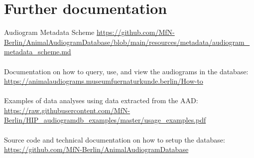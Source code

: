 \documentclass{article}
\begin{document}
\section{Further documentation}
Audiogram Metadata Scheme
\url{https://github.com/MfN-Berlin/AnimalAudiogramDatabase/blob/main/resources/metadata/audiogram_metadata_scheme.md}
\\\\
Documentation on how to query, use, and view the audiograms in the database:
\url{https://animalaudiograms.museumfuernaturkunde.berlin/How-to}
\\\\
Examples of data analyses using data extracted from the AAD:
\url{https://raw.githubusercontent.com/MfN-Berlin/HIP_audiogramdb_examples/master/usage_examples.pdf}
\\\\
Source code and technical documentation on how to setup the database: \url{https://github.com/MfN-Berlin/AnimalAudiogramDatabase}
\end{document}

